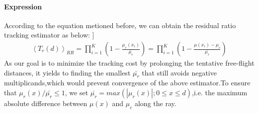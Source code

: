 \documentclass[acmtog]{acmart}
\begin{document}
\paragraph{\textbf{Expression}}
According to the equation metioned before, we can obtain the residual ratio tracking estimator as below:
]\begin{equation}
	\begin{aligned}
		\left<T_r(d)\right>_{RR} = \prod_{i=1}^{K}(1-\frac{\mu_r(x_i)}{\bar{\mu_r}}) = \prod_{i=1}^{K}(1-\frac{\mu(x_i)-\mu_c}{\bar{\mu_r}})
	\end{aligned}
\end{equation}
As our goal is to minimize the tracking cost by prolonging the tentative free-flight distances, it yields to finding the smallest $\bar{\mu_r}$ that still avoids negative multiplicands,which would prevent convergence of the above estimator.To ensure that $\mu_r(x)/\bar{\mu_r} \leq 1$, we set $\bar{\mu_r} = max(|\mu_r(x)|;0\leq x \leq d)$,i.e. the maximum absolute difference between $\mu(x)$ and $\mu_c$ along the ray.
\end{document}
